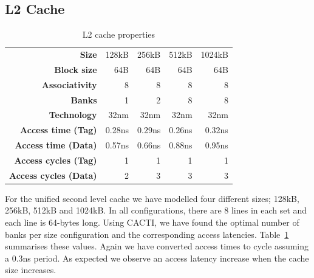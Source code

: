 \subsection{L2 Cache}
\begin{table}[ht]
\centering
\begin{tabular}{rrrrr}
\toprule
\bf{Size}                 & 128kB       & 256kB       & 512kB       & 1024kB            \\
\bf{Block size}           & 64B         & 64B         & 64B         & 64B               \\
\bf{Associativity}        & 8           & 8           & 8           & 8                 \\
\bf{Banks}                & 1           & 2           & 8           & 8                 \\
\bf{Technology}           & 32nm        & 32nm        & 32nm        & 32nm              \\
\bf{Access time (Tag)}    & 0.28ns      & 0.29ns      & 0.26ns      & 0.32ns            \\
\bf{Access time (Data)}   & 0.57ns      & 0.66ns      & 0.88ns      & 0.95ns            \\
\bf{Access cycles (Tag)}  & 1           & 1           & 1           & 1                 \\
\bf{Access cycles (Data)} & 2           & 3           & 3           & 3                 \\
\bottomrule
\end{tabular}
\caption{L2 cache properties}
\label{tbl:processor_model:l2}
\end{table}

For the unified second level cache we have modelled four different sizes; 128kB, 256kB, 512kB and 1024kB. 
In all configurations, there are 8 lines in each set and each line is 64-bytes long.
Using CACTI, we have found the optimal number of banks per size configuration and the corresponding access latencies.
Table~\ref{tbl:processor_model:l2} summarises these values. 
Again we have converted access times to cycle assuming a 0.3ns period.
As expected we observe an access latency increase when the cache size increases.

